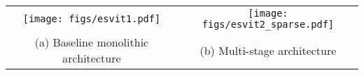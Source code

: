 \documentclass{article} \usepackage{iclr2022_conference,times}
\begin{document}
\begin{figure*}[t!]\vspace{-0mm}\centering
	\begin{tabular}{c c}
		\hspace{-4mm}
		\texttt{[image: figs/esvit1.pdf]}  & 
\hspace{-0mm}
		\texttt{[image: figs/esvit2\_sparse.pdf]} \\
		(a) Baseline monolithic architecture \vspace{2mm} & 
		\hspace{-6mm}
		(b) Multi-stage architecture \hspace{-0mm} \\ 
	\end{tabular}
	\vspace{-3mm}
	\caption{Architecture comparison. (a) The monolithic transformer. For all layers, the transformer blocks share the same network configurations and input token sequence sizes are the same. (b) The multi-stage Transformer organizes an input image into a long sequence of smaller patches, sparse self-attentions (S.A.) are utilized at early stages to maintain model expressiveness while reducing computational complexity; The neighboring tokens at an intermediate layer are gradually merged, constituting a short sequence to ease the compute burden of self-attention at late stages.
	 }
	\vspace{-0mm}
	\label{fig:illustration_esvit}
\end{figure*}
\end{document}
